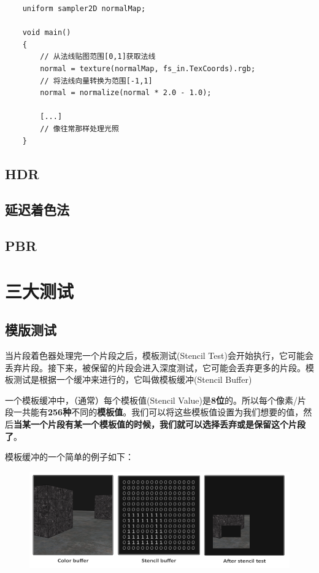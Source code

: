 \documentclass[UTF8,a4paper,12pt]{ctexbook}
\begin{document}
		\begin{lstlisting}
	uniform sampler2D normalMap;  
	
	void main()
	{           
	    // 从法线贴图范围[0,1]获取法线
	    normal = texture(normalMap, fs_in.TexCoords).rgb;
	    // 将法线向量转换为范围[-1,1]
	    normal = normalize(normal * 2.0 - 1.0);   
	
	    [...]
	    // 像往常那样处理光照
	}		
		\end{lstlisting}
		
	
	\section{HDR}
	
	
	\section{延迟着色法}

	
	\section{PBR}
	
	
	
	
\chapter{三大测试}
	\section{模版测试}
		当片段着色器处理完一个片段之后，模板测试(Stencil Test)会开始执行，它可能会丢弃片段。接下来，被保留的片段会进入深度测试，它可能会丢弃更多的片段。模板测试是根据一个缓冲来进行的，它叫做模板缓冲(Stencil Buffer)
	
		一个模板缓冲中，（通常）每个模板值(Stencil Value)是\textbf{8位}的。所以每个像素/片段一共能有\textbf{256种}不同的\textbf{模板值}。我们可以将这些模板值设置为我们想要的值，然后\textbf{当某一个片段有某一个模板值的时候，我们就可以选择丢弃或是保留这个片段了}。
	
		模板缓冲的一个简单的例子如下：
		\begin{figure}[H]
			\centering
			\includegraphics[width=.9\linewidth]{stencil_buffer}
		\end{figure}
		
\end{document}
